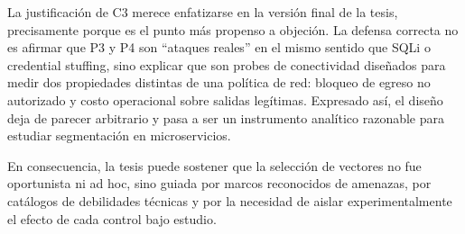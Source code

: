La justificación de C3 merece enfatizarse en la versión final de la tesis, precisamente porque es el punto más propenso a objeción. La defensa correcta no es afirmar que P3 y P4 son ``ataques reales'' en el mismo sentido que SQLi o credential stuffing, sino explicar que son probes de conectividad diseñados para medir dos propiedades distintas de una política de red: bloqueo de egreso no autorizado y costo operacional sobre salidas legítimas. Expresado así, el diseño deja de parecer arbitrario y pasa a ser un instrumento analítico razonable para estudiar segmentación en microservicios.

En consecuencia, la tesis puede sostener que la selección de vectores no fue oportunista ni ad hoc, sino guiada por marcos reconocidos de amenazas, por catálogos de debilidades técnicas y por la necesidad de aislar experimentalmente el efecto de cada control bajo estudio.